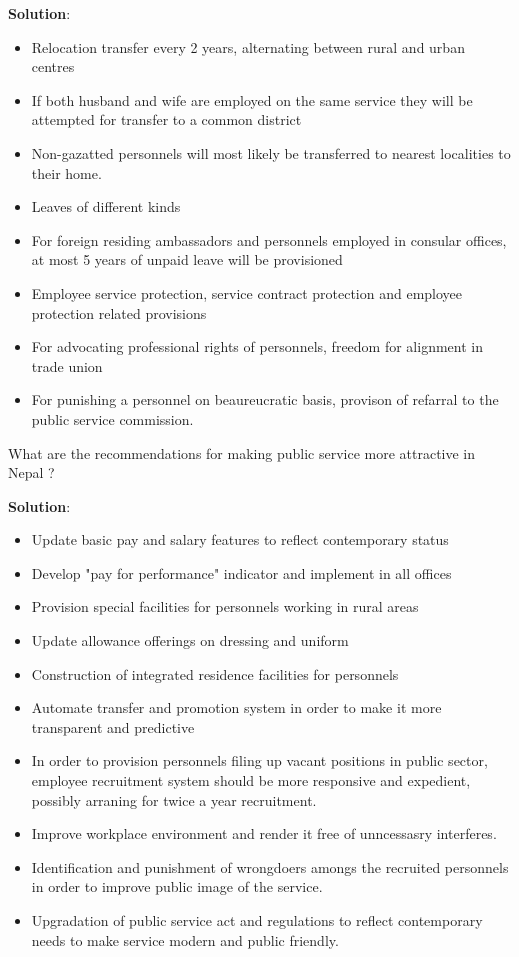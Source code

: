 \documentclass[
]{book}
\newcommand{\question}{\item}
\newenvironment{solution}{ {\bfseries Solution}:}{}
\begin{document}
\begin{questions}
\begin{solution}
\begin{itemize}
\item Relocation transfer every 2 years, alternating between rural and urban centres
\item If both husband and wife are employed on the same service they will be attempted for transfer to a common district
\item Non-gazatted personnels will most likely be transferred to nearest localities to their home.
\item Leaves of different kinds
\item For foreign residing ambassadors and personnels employed in consular offices, at most 5 years of unpaid leave will be provisioned
\item Employee service protection, service contract protection and employee protection related provisions
\item For advocating professional rights of personnels, freedom for alignment in trade union
\item For punishing a personnel on beaureucratic basis, provison of refarral to the public service commission.
\end{itemize}

\end{solution}

\question What are the recommendations for making public service more attractive in Nepal ?

\begin{solution}
\begin{itemize}
\item Update basic pay and salary features to reflect contemporary status
\item Develop "pay for performance" indicator and implement in all offices
\item Provision special facilities for personnels working in rural areas
\item Update allowance offerings on dressing and uniform
\item Construction of integrated residence facilities for personnels
\item Automate transfer and promotion system in order to make it more transparent and predictive
\item In order to provision personnels filing up vacant positions in public sector, employee recruitment system should be more responsive and expedient, possibly arraning for twice a year recruitment.
\item Improve workplace environment and render it free of unncessasry interferes.
\item Identification and punishment of wrongdoers amongs the recruited personnels in order to improve public image of the service.
\item Upgradation of public service act and regulations to reflect contemporary needs to make service modern and public friendly.
\end{itemize}


\end{solution}
\end{questions}
\end{document}
